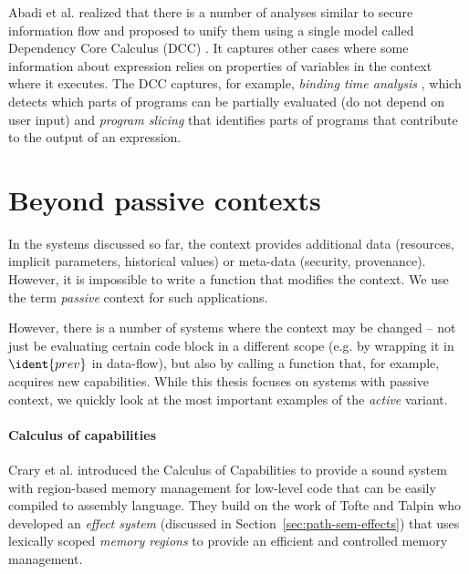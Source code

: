Abadi et al. realized that there is a number of analyses similar to secure information flow
and proposed to unify them using a single model called Dependency Core Calculus (DCC) \cite{app-dcc}.
It captures other cases where some information about expression relies on properties of variables
in the context where it executes.  The DCC captures, for example, \emph{binding time analysis}
\cite{app-binding-time-analysis}, which detects which parts of programs can be partially evaluated
(do not depend on user input) and \emph{program slicing} \cite{app-slicing-survey} that identifies
parts of programs that contribute to the output of an expression.
	


\section{Beyond passive contexts}

In the systems discussed so far, the context provides additional data (resources, implicit 
parameters, historical values) or meta-data (security, provenance). However, it is impossible to
write a function that modifies the context. We use the term \emph{passive} context for such 
applications. 

However, there is a number of systems where the context may be changed -- not just be evaluating
certain code block in a different scope (e.g. by wrapping it in $\ident{prev}$ in data-flow), but
also by calling a function that, for example, acquires new capabilities. While this thesis focuses
on systems with passive context, we quickly look at the most important examples of the 
\emph{active} variant.


\paragraph{Calculus of capabilities}
\label{sec:applications-active-ccc}

Crary et al. \cite{app-capabilities} introduced the Calculus of Capabilities to provide 
a sound system with region-based memory management for low-level code that can be easily 
compiled to assembly language. They build on the work of Tofte and Talpin \cite{app-region-memory}
who developed an \emph{effect system} (discussed in Section~\ref{sec:path-sem-effects}) that uses
lexically scoped \emph{memory regions} to provide an efficient and controlled memory management.

